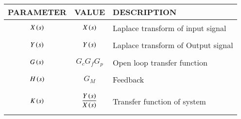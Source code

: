 \begin{tabular}{|p{2cm}|p{2cm}|p{4cm}|}
    \hline
    PARAMETER & VALUE & DESCRIPTION   \\ \hline
    $$X\left(s\right)$$ & $$X\left(s\right)$$ & Laplace transform of input signal  \\ \hline
    $$Y\left(s\right)$$ & $$Y\left(s\right)$$ & Laplace transform of Output signal  \\ \hline
    $$G\left(s\right)$$ & $$G_c G_f G_p$$ & Open loop transfer function    \\ \hline
    $$H\left(s\right)$$ & $$G_M$$ & Feedback  \\ \hline
    $$K\left(s\right)$$ & $$\frac{Y\left(s\right)}{X\left(s\right)}$$ & Transfer function of system   \\ \hline
    \end{tabular}
